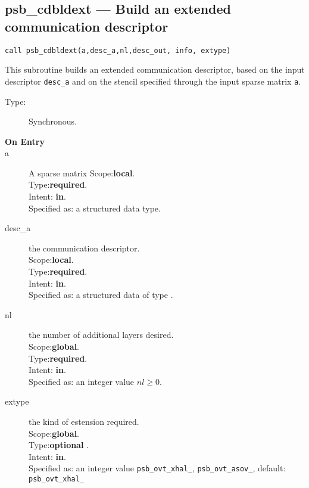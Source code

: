 %
%
\clearpage\subsection*{psb\_cdbldext --- Build an extended  communication
  descriptor}

\begin{verbatim}
call psb_cdbldext(a,desc_a,nl,desc_out, info, extype)
\end{verbatim}

This subroutine builds an extended communication descriptor, based on
the input descriptor \verb|desc_a| and on the stencil specified
through the input sparse matrix \verb|a|. 
\begin{description}
\item[Type:] Synchronous.
\item[\bf On Entry]
\item[a] A sparse matrix
Scope:{\bf local}.\\
Type:{\bf required}.\\
Intent: {\bf in}.\\
Specified as: a structured data type.
\item[desc\_a] the communication descriptor.\\
Scope:{\bf local}.\\
Type:{\bf required}.\\
Intent: {\bf in}.\\
Specified as: a structured data of type \spdata.
\item[nl] the number of additional layers desired.\\
Scope:{\bf global}.\\
Type:{\bf required}.\\
Intent: {\bf in}.\\
Specified as: an integer value $nl\ge 0$. 
\item[extype] the kind of estension required.\\
Scope:{\bf global}.\\
Type:{\bf optional }.\\
Intent: {\bf in}.\\
Specified as: an integer value
\verb|psb_ovt_xhal_|, \verb|psb_ovt_asov_|, default: \verb|psb_ovt_xhal_|

\end{description}

